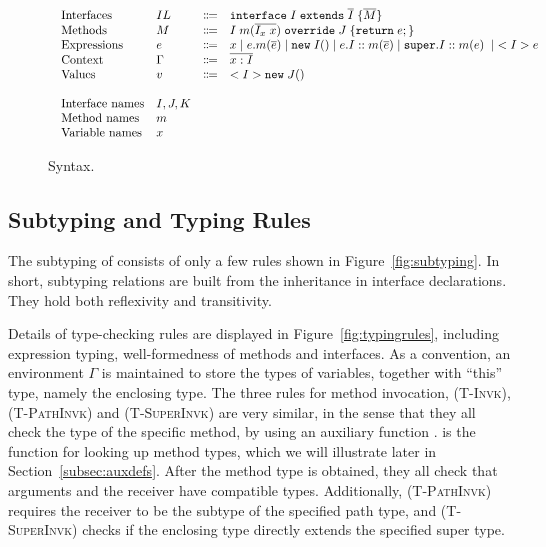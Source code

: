 \begin{figure}[t]
\begin{displaymath}
\begin{array}{l}
\begin{array}{llrl}
\text{Interfaces}   & IL & \Coloneqq & \texttt{interface} \; I \; \texttt{extends} \; \overline{I} \; {\{} \overline{M} {\}} \\
\text{Methods}      & M  & \Coloneqq & I \; m (\overline{I_x \; x}) \; \texttt{override} \; J \; {\{} \texttt{return} \; e ; {\}} \\
\text{Expressions}  & e  & \Coloneqq & x \mid
e.m(\overline{e}) \mid
\texttt{new} \; I() \mid
e.I::m(\overline{e}) \mid
\texttt{super}.I::m(e) \; \mid \; <I> e \\
\text{Context}      & \Gamma & \Coloneqq & \overline{x:I} \\
\text{Values}       & v & \Coloneqq & <I>\texttt{new} \; J() \\
\\
\text{Interface names} & I, J, K & & \\
\text{Method names} & m & & \\
\text{Variable names} & x & &
\end{array}
\end{array}
\end{displaymath}
\caption{Syntax.}\label{fig:syntax}
\end{figure}

\subsection{Subtyping and Typing Rules}
The subtyping of \MIM{} consists of only a few rules shown in Figure~\ref{fig:subtyping}.
In short, subtyping relations are built from the inheritance in interface
declarations. They hold both reflexivity and transitivity.

Details of type-checking rules are displayed in Figure~\ref{fig:typingrules}, including expression
typing, well-formedness of methods and interfaces. As a convention, an environment
$\Gamma$ is maintained to store the types of variables, together with ``this'' type, namely
the enclosing type. The three rules for method invocation, \textsc{(T-Invk)}, \textsc{(T-PathInvk)} and \textsc{(T-SuperInvk)}
are very similar, in the sense that they all check the type of the specific method, by using
an auxiliary function \mtype. \mtype{} is the function for looking up method types, which we will
illustrate later in Section~\ref{subsec:auxdefs}. After the method type is obtained, they all check that arguments and the receiver
have compatible types. Additionally, \textsc{(T-PathInvk)} requires the receiver to be the subtype of the specified
path type, and \textsc{(T-SuperInvk)} checks if the enclosing type directly extends the specified super type.

